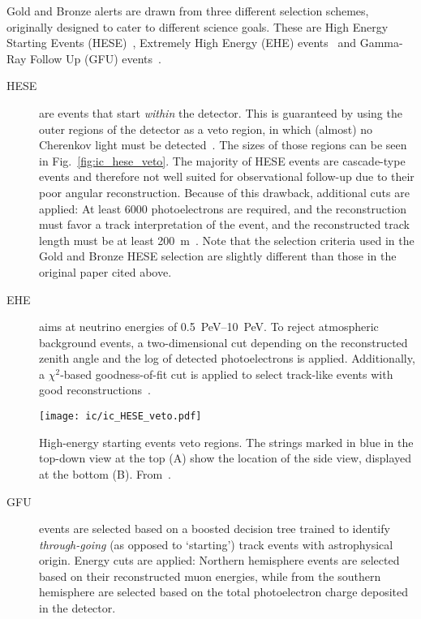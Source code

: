 Gold and Bronze alerts are drawn from three different selection schemes, originally designed to cater to different science goals. These are High Energy Starting Events (HESE)~, Extremely High Energy (EHE) events~ and Gamma-Ray Follow Up (GFU) events~.

\begin{description}

    \item[HESE] are events that start \textit{within} the detector. This is guaranteed by using the outer regions of the detector as a veto region, in which (almost) no Cherenkov light must be detected~\cite{Aartsen2013}. The sizes of those regions can be seen in Fig.~\ref{fig:ic_hese_veto}. The majority of HESE events are cascade-type events and therefore not well suited for observational follow-up due to their poor angular reconstruction. Because of this drawback, additional cuts are applied: At least 6000 photoelectrons are required, and the reconstruction must favor a track interpretation of the event, and the reconstructed track length must be at least \SI{200}{\meter}~\cite{Abbasi2023}. Note that the selection criteria used in the Gold and Bronze HESE selection are slightly different than those in the original paper cited above.

    \item[EHE] aims at neutrino energies of \SIrange{0.5}{10}{\peta\eV}. To reject atmospheric background events, a two-dimensional cut depending on the reconstructed zenith angle and the log of detected photoelectrons is applied. Additionally, a $\chi^2$-based goodness-of-fit cut is applied to select track-like events with good reconstructions~\cite{Abbasi2023}.

          \begin{marginfigure}
              \texttt{[image: ic/ic\_HESE\_veto.pdf]}
              \caption[HESE veto regions]{High-energy starting events veto regions. The strings marked in blue in the top-down view at the top (A) show the location of the side view, displayed at the bottom (B). From~\cite{Aartsen2013}.}
          \end{marginfigure}

    \item[GFU] events are selected based on a boosted decision tree trained to identify \textit{through-going} (as opposed to `starting') track events with astrophysical origin. Energy cuts are applied: Northern hemisphere events are selected based on their reconstructed muon energies, while from the southern hemisphere are selected based on the total photoelectron charge deposited in the detector.
\end{description}

